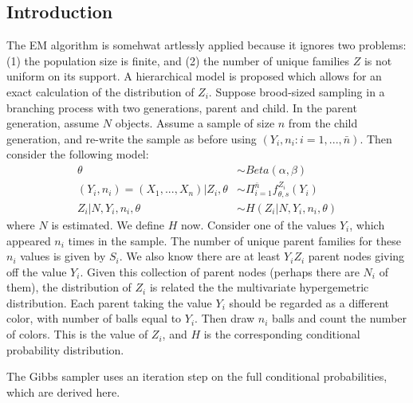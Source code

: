 \documentclass[11 pt]{article}
\renewcommand{\th}{\theta}
\newcommand{\fths}{f_{\th,s}}
\begin{document}
\subsection{Introduction}

The EM algorithm is somehwat artlessly applied because it ignores two problems: (1) the population size is finite, and (2) the number of unique families $Z$ is not uniform on its support. A hierarchical model is proposed which allows for an exact calculation of the distribution of $Z_i$. Suppose brood-sized sampling in a branching process with two generations, parent and child. In the parent generation, assume $N$ objects. Assume a sample of size $n$ from the child generation, and re-write the sample as before using $(Y_i,n_i : i=1,...,\bar{n})$. Then consider the following model:
\begin{align*}
\th &\sim Beta(\alpha, \beta) \\
(Y_i, n_i) = (X_1,...,X_n) | Z_i, \th &\sim \Pi_{i=1}^{\bar{n}} \fths^{Z_i}(Y_i) \\
Z_i | N, Y_i, n_i, \th &\sim H(Z_i | N, Y_i, n_i, \th)
\end{align*}
where $N$ is estimated. We define $H$ now. Consider one of the values $Y_i$, which appeared $n_i$ times in the sample. The number of unique parent families for these $n_i$ values is given by $S_i$. We also know there are at least $Y_i  Z_i$ parent nodes giving off the value $Y_i$. Given this collection of parent nodes (perhaps there are $N_i$ of them), the distribution of $Z_i$ is related the the multivariate hypergemetric distribution. Each parent taking the value $Y_i$ should be regarded as a different color, with number of balls equal to $Y_i$. Then draw $n_i$ balls and count the number of colors. This is the value of $Z_i$, and $H$ is the corresponding conditional probability distribution. 

The Gibbs sampler uses an iteration step on the full conditional probabilities, which are derived here.
\end{document}
